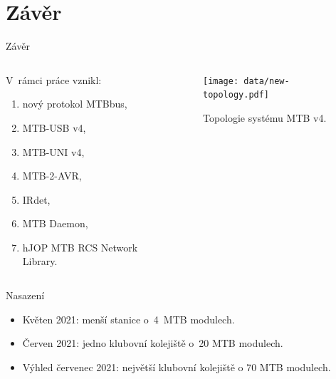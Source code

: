 \documentclass[aspectratio=169]{beamer}
\begin{document}

\section{Závěr}

\begin{frame}{Závěr}
\begin{columns}
	\begin{column}{.5\textwidth}
		V rámci práce vznikl:
		\begin{enumerate}
		\item nový protokol MTBbus,
		\item MTB-USB v4,
		\item MTB-UNI v4,
		\item MTB-2-AVR,
		\item IRdet,
		\item MTB Daemon,
		\item hJOP MTB RCS Network Library.
		\end{enumerate}
	\end{column}
	\begin{column}{.5\textwidth}
		\begin{figure}
		\texttt{[image: data/new-topology.pdf]}
		\caption{Topologie systému MTB v4.}
		\end{figure}
	\end{column}
\end{columns}
\end{frame}


\begin{frame}{Nasazení}
\begin{itemize}
\item Květen 2021: menší stanice o 4 MTB modulech.
\item Červen 2021: jedno klubovní kolejiště o 20 MTB modulech.
\item Výhled červenec 2021: největší klubovní kolejiště o 70 MTB modulech.
\end{itemize}
\end{frame}

\end{document}
